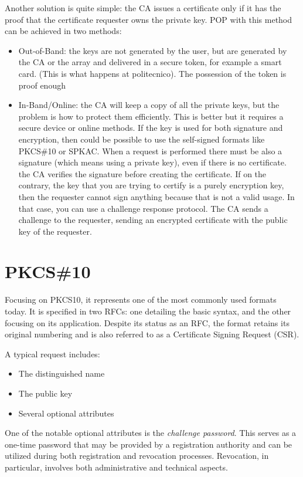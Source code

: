 Another solution is quite simple: the CA issues a certificate only if
it has the proof that the certificate requester owns the private key.
POP with this method can be achieved in two methods:
\begin{itemize}
  \item Out-of-Band: the keys are not generated by the user, but are
    generated by the CA or the array and delivered in a secure token,
    for example a smart card. (This is what happens at politecnico).
    The possession of the token is proof enough
  \item In-Band/Online: the CA will keep a copy of all the private keys, but
    the problem is how to protect them efficiently. This is better but
    it requires a secure device or online methods. If the key is used
    for both signature and encryption, then could be possible to use
    the self-signed formats like PKCS\#10 or SPKAC.  When a request is
    performed there must be also a signature (which means using a
    private key), even if there is no certificate. the CA verifies the
    signature before creating the certificate. If on the contrary, the
    key that you are trying to certify is a purely encryption key,
    then the requester cannot sign anything because that is not a
    valid usage. In that case, you can use a challenge response
    protocol. The CA sends a challenge to the requester, sending an
    encrypted certificate with the public key of the requester. 
\end{itemize}

\section{PKCS\#10}

Focusing on PKCS10, it represents one of the most commonly used
formats today. It is specified in two RFCs: one detailing the basic
syntax, and the other focusing on its application. Despite its status
as an RFC, the format retains its original numbering and is also
referred to as a Certificate Signing Request (CSR).

A typical request includes:
\begin{itemize}
    \item The distinguished name
    \item The public key
    \item Several optional attributes
\end{itemize}

One of the notable optional attributes is the \textit{challenge
password}. This serves as a one-time password that may be provided by a
registration authority and can be utilized during both registration and
revocation processes. Revocation, in particular, involves both
administrative and technical aspects.

